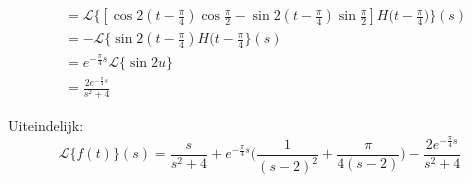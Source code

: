 \documentclass[12pt]{report}
\begin{document}
\begin{itemize}[label={}]
{{\begin{enumerate}
\begin{equation*}
\begin{split}
                                                                        & = \mathcal{L}\{[\cos 2(t - \frac{\pi}{4})\cos\frac{\pi}{2} - \sin 2(t - \frac{\pi}{4})\sin\frac{\pi}{2}]H\big(t - \frac{\pi}{4})\}(s) \\
                                                                        & = - \mathcal{L}\{\sin 2(t - \frac{\pi}{4})H(t - \frac{\pi}{4}\}(s) \\
                                                                        & = e^{-\frac{\pi}{4}s}\mathcal{L}\{\sin 2u\} \\
                                                                        & = \frac{2e^{-\frac{\pi}{4}s}}{s^2 + 4}
            \end{split}
           \end{equation*}
    \end{enumerate}
    Uiteindelijk:
    $$\mathcal{L}\{f(t)\}(s) = \frac{s}{s^2 + 4} + e^{-\frac{\pi}{4}s}\bigg(\frac{1}{(s - 2)^2} +  \frac{\pi}{4(s - 2)}\bigg) - \frac{2e^{-\frac{\pi}{4}s}}{s^2 + 4}$$
    }
 }
 
 
\end{itemize}
\end{document}

